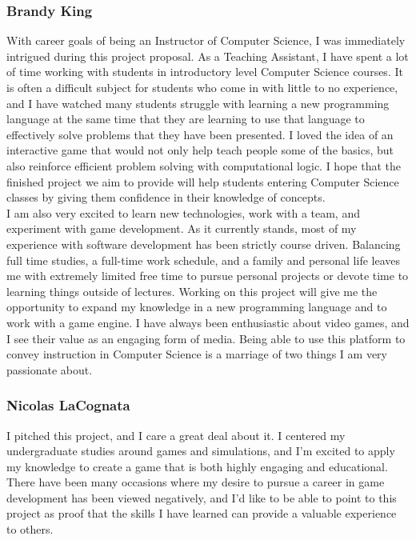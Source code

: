 \subsubsection{Brandy King}
With career goals of being an Instructor of Computer Science, I was immediately
intrigued during this project proposal. As a Teaching Assistant, I have spent a
lot of time working with students in introductory level Computer Science
courses. It is often a difficult subject for students who come in with little to
no experience, and I have watched many students struggle with learning a new
programming language at the same time that they are learning to use that
language to effectively solve problems that they have been presented. I loved
the idea of an interactive game that would not only help teach people some of
the basics, but also reinforce efficient problem solving with computational
logic. I hope that the finished project we aim to provide will help students
entering Computer Science classes by giving them confidence in their knowledge
of concepts.\\

I am also very excited to learn new technologies, work with a team, and
experiment with game development. As it currently stands, most of my experience
with software development has been strictly course driven. Balancing full time
studies, a full-time work schedule, and a family and personal life leaves me
with extremely limited free time to pursue personal projects or devote time to
learning things outside of lectures. Working on this project will give me the
opportunity to expand my knowledge in a new programming language and to work
with a game engine. I have always been enthusiastic about video games, and I see
their value as an engaging form of media. Being able to use this platform to
convey instruction in Computer Science is a marriage of two things I am very
passionate about.\\

\subsubsection{Nicolas LaCognata}
I pitched this project, and I care a great deal about it. I centered my
undergraduate studies around games and simulations, and I’m excited to apply my
knowledge to create a game that is both highly engaging and educational. There
have been many occasions where my desire to pursue a career in game development
has been viewed negatively, and I’d like to be able to point to this project as
proof that the skills I have learned can provide a valuable experience to
others.\\

